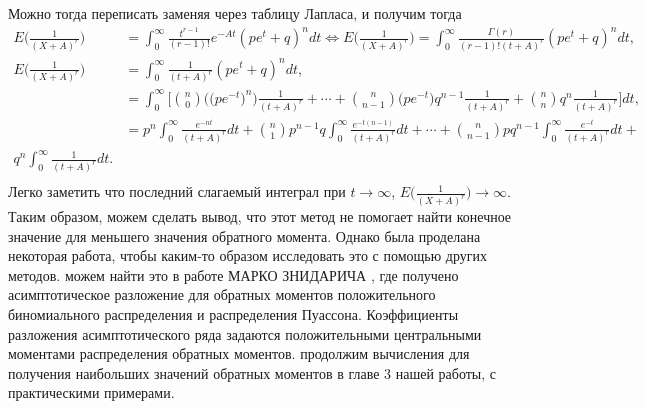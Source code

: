 \documentclass[13pt]{article}
\begin{document}
\vspace{6 mm}
Можно тогда переписать заменяя через таблицу Лапласа, и получим тогда 
\begin{align*}
   E\Big(\frac{1}{(X+A)^{r}}\Big) &=\int_{0}^{\infty}\frac{t^{r-1}}{(r-1)!}e^{-At}(pe^{t}+ q)^{n}dt \Longleftrightarrow E\Big(\frac{1}{(X+A)^{r}}\Big) = \int_{0}^{\infty} \frac{\Gamma(r)}{(r-1)!(t+A)^{r}}(pe^{t}+ q)^{n}dt, \\
   E\Big(\frac{1}{(X+A)^{r}}\Big) &= \int_{0}^{\infty}\frac{1}{(t+A)^{r}}(pe^{t}+ q)^{n}dt, \\
   &= \int_{0}^{\infty} \Bigg[\binom{n}{0}\Big(\big(pe^{-t}\big)^{n}\Big)\frac{1}{(t+A)^{r}} +\cdots 
    +\binom{n}{n-1}\big(pe^{-t}\big)q^{n-1} \frac{1}{(t+A)^{r}} 
    +\binom{n}{n}q^{n}\frac{1}{(t+A)^r}\Bigg]dt,\\
   &= p^{n} \int_{0}^{\infty}\frac{e^{-nt}}{(t+A)^r}dt + \binom{n}{1}p^{n-1}q\int_{0}^{\infty}\frac{e^{-t(n-1)}}{(t+A)^r}dt +\cdots+ \binom{n}{n-1}pq^{n-1}\int_{0}^{\infty}\frac{e^{-t}}{(t+A)^{r}}dt + \\q^{n}\int_{0}^{\infty}\frac{1}{(t+A)^{r}}dt.\\  
\end{align*}
Легко  заметить что последний слагаемый интеграл при $t \to \infty$,  $E\Big(\frac{1}{(X+A)^{r}}\Big) \to \infty$. Таким образом, можем сделать вывод, что этот метод не помогает найти конечное значение для меньшего значения обратного момента. Однако была проделана некоторая работа, чтобы каким-то образом исследовать это с помощью других методов. можем найти это в работе МАРКО ЗНИДАРИЧА \cite{znidaric2005asymptotic}, где получено асимптотическое разложение для обратных моментов положительного биномиального распределения и распределения Пуассона. Коэффициенты разложения асимптотического ряда задаются положительными центральными моментами распределения обратных моментов. продолжим вычисления для получения наибольших значений обратных моментов в главе 3 нашей работы, с практическими примерами.
\end{document}
